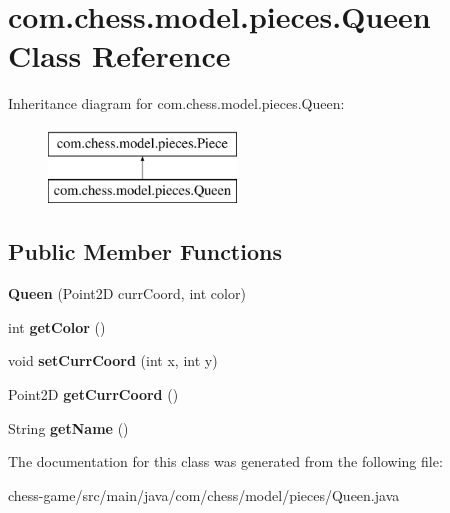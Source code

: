 \hypertarget{classcom_1_1chess_1_1model_1_1pieces_1_1_queen}{}\section{com.\+chess.\+model.\+pieces.\+Queen Class Reference}
\label{classcom_1_1chess_1_1model_1_1pieces_1_1_queen}
Inheritance diagram for com.\+chess.\+model.\+pieces.\+Queen\+:\begin{figure}[H]
\begin{center}
\leavevmode
\includegraphics[height=2.000000cm]{classcom_1_1chess_1_1model_1_1pieces_1_1_queen}
\end{center}
\end{figure}
\subsection*{Public Member Functions}
\begin{DoxyCompactItemize}
\item 
\mbox{\label{classcom_1_1chess_1_1model_1_1pieces_1_1_queen_ab41bf20adaa97bae10d7af1c695c42fc}} 
{\bfseries Queen} (Point2D curr\+Coord, int color)
\item 
\mbox{\label{classcom_1_1chess_1_1model_1_1pieces_1_1_queen_ade8f65aa00f724d1d595b75fb9434446}} 
int {\bfseries get\+Color} ()
\item 
\mbox{\label{classcom_1_1chess_1_1model_1_1pieces_1_1_queen_adbe66962a7044b654e7254419c7eac9a}} 
void {\bfseries set\+Curr\+Coord} (int x, int y)
\item 
\mbox{\label{classcom_1_1chess_1_1model_1_1pieces_1_1_queen_ab3c091b7f8ac71f1a9cc37e01cb03bb5}} 
Point2D {\bfseries get\+Curr\+Coord} ()
\item 
\mbox{\label{classcom_1_1chess_1_1model_1_1pieces_1_1_queen_a2651627014be35ea15e3e5d494bbc760}} 
String {\bfseries get\+Name} ()
\end{DoxyCompactItemize}


The documentation for this class was generated from the following file\+:\begin{DoxyCompactItemize}
\item 
chess-\/game/src/main/java/com/chess/model/pieces/Queen.\+java\end{DoxyCompactItemize}
